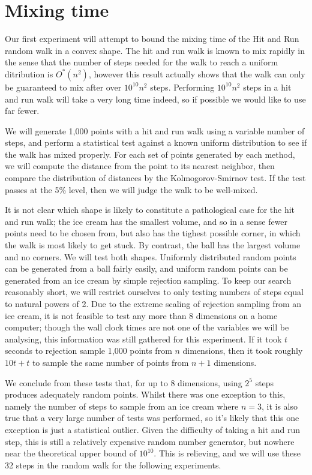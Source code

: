\section{Mixing time}\label{sec_mix}

Our first experiment will attempt to bound the mixing time of the Hit and Run random walk in a convex shape. The hit and run walk is known to mix rapidly \cite{Lovasz98, Lovasz05} in the sense that the number of steps needed for the walk to reach a uniform ditribution is $O^{*}(n^2)$, however this result actually shows that the walk can only be guaranteed to mix after over $10^{10} n^2$ steps. Performing $10^{10} n^2$ steps in a hit and run walk will take a very long time indeed, so if possible we would like to use far fewer.

We will generate 1,000 points with a hit and run walk using a variable number of steps, and perform a statistical test against a known uniform distribution to see if the walk has mixed properly. For each set of points generated by each method, we will compute the distance from the point to its nearest neighbor, then compare the distribution of distances by the Kolmogorov-Smirnov test. If the test passes at the 5\% level, then we will judge the walk to be well-mixed.

It is not clear which shape is likely to constitute a pathological case for the hit and run walk; the ice cream has the smallest volume, and so in a sense fewer points need to be chosen from, but also has the tighest possible corner, in which the walk is most likely to get stuck. By contrast, the ball has the largest volume and no corners. We will test both shapes. Uniformly distributed random points can be generated from a ball fairly easily, and uniform random points can be generated from an ice cream by simple rejection sampling. To keep our search reasonably short, we will restrict ourselves to only testing numbers of steps equal to natural powers of 2. Due to the extreme scaling of rejection sampling from an ice cream, it is not feasible to test any more than 8 dimensions on a home computer; though the wall clock times are not one of the variables we will be analysing, this information was still gathered for this experiment. If it took $t$ seconds to rejection sample 1,000 points from $n$ dimensions, then it took roughly $10t+t$ to sample the same number of points from $n+1$ dimensions.

We conclude from these tests that, for up to 8 dimensions, using $2^5$ steps produces adequately random points. Whilst there was one exception to this, namely the number of steps to sample from an ice cream where $n=3$, it is also true that a very large number of tests was performed, so it's likely that this one exception is just a statistical outlier. Given the difficulty of taking a hit and run step, this is still a relatively expensive random number generator, but nowhere near the theoretical upper bound of $10^{10}$. This is relieving, and we will use these 32 steps in the random walk for the following experiments.

